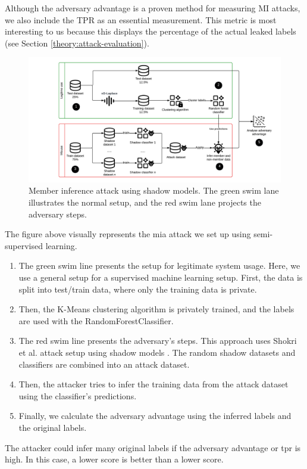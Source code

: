 \begin{enumerate}
            Although the adversary advantage is a proven method for measuring MI attacks, we also include the TPR as an essential measurement.
            This metric is most interesting to us because this displays the percentage of the actual leaked labels (see Section \ref{theory:attack-evaluation}).
            \begin{figure}[H]
                  \includegraphics[width=1.1\textwidth]{Method/images/MI-setup.png}
                  \caption{Member inference attack using shadow models. The green swim lane illustrates the normal setup, and the red swim lane projects the adversary steps.}
                  \label{figure:mi-attack}
            \end{figure}
            The figure above visually represents the \gls{mia} attack we set up using semi-supervised learning.
            \begin{enumerate}
                  \item The green swim line presents the setup for legitimate system usage.
                        Here, we use a general setup for a supervised machine learning setup.
                        First, the data is split into test/train data, where only the training data is private.
                  \item Then, the K-Means clustering algorithm is privately trained, and the labels are used with the RandomForestClassifier.
                  \item The red swim line presents the adversary's steps.
                        This approach uses Shokri et al. attack setup using shadow models \citep{shokri_membership_2017}.
                        The random shadow datasets and classifiers are combined into an attack dataset.
                  \item Then, the attacker tries to infer the training data from the attack dataset using the classifier's predictions.
                  \item Finally, we calculate the adversary advantage using the inferred labels and the original labels.
            \end{enumerate}
            The attacker could infer many original labels if the adversary advantage or \gls{tpr} is high.
            In this case, a lower score is better than a lower score.
\end{enumerate}
%

